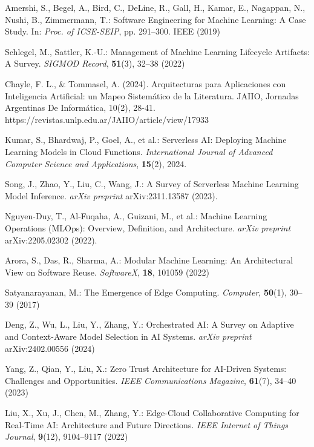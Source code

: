 \documentclass[a4paper]{llncs}
\begin{document}
\begin{thebibliography}{9}

Amershi, S., Begel, A., Bird, C., DeLine, R., Gall, H., Kamar, E., Nagappan, N., Nushi, B., Zimmermann, T.:
Software Engineering for Machine Learning: A Case Study.
In: \textit{Proc. of ICSE-SEIP}, pp. 291–300. IEEE (2019)

Schlegel, M., Sattler, K.-U.:
Management of Machine Learning Lifecycle Artifacts: A Survey.
\textit{SIGMOD Record}, \textbf{51}(3), 32–38 (2022)

Chayle, F. L., \& Tommasel, A. (2024). Arquitecturas para Aplicaciones con Inteligencia Artificial: un Mapeo Sistemático de la Literatura. JAIIO, Jornadas Argentinas De Informática, 10(2), 28-41. https://revistas.unlp.edu.ar/JAIIO/article/view/17933

Kumar, S., Bhardwaj, P., Goel, A., et al.:
Serverless AI: Deploying Machine Learning Models in Cloud Functions.
\textit{International Journal of Advanced Computer Science and Applications}, \textbf{15}(2), 2024.

Song, J., Zhao, Y., Liu, C., Wang, J.:
A Survey of Serverless Machine Learning Model Inference.
\textit{arXiv preprint} arXiv:2311.13587 (2023).

Nguyen-Duy, T., Al-Fuqaha, A., Guizani, M., et al.:
Machine Learning Operations (MLOps): Overview, Definition, and Architecture.
\textit{arXiv preprint} arXiv:2205.02302 (2022).

Arora, S., Das, R., Sharma, A.:
Modular Machine Learning: An Architectural View on Software Reuse.
\textit{SoftwareX}, \textbf{18}, 101059 (2022)

Satyanarayanan, M.:
The Emergence of Edge Computing.
\textit{Computer}, \textbf{50}(1), 30–39 (2017)

Deng, Z., Wu, L., Liu, Y., Zhang, Y.:
Orchestrated AI: A Survey on Adaptive and Context-Aware Model Selection in AI Systems.
\textit{arXiv preprint} arXiv:2402.00556 (2024)

Yang, Z., Qian, Y., Liu, X.:
Zero Trust Architecture for AI-Driven Systems: Challenges and Opportunities.
\textit{IEEE Communications Magazine}, \textbf{61}(7), 34–40 (2023)

Liu, X., Xu, J., Chen, M., Zhang, Y.:
Edge-Cloud Collaborative Computing for Real-Time AI: Architecture and Future Directions.
\textit{IEEE Internet of Things Journal}, \textbf{9}(12), 9104–9117 (2022)


\end{thebibliography}
\end{document}
